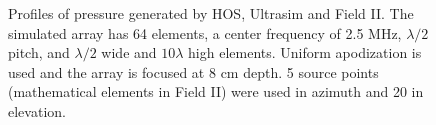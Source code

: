 \begin{figure}[!t]
\centerline{
\newline
{}
}
\caption{Profiles of pressure generated by HOS, Ultrasim and Field II. The simulated array has 64 elements, a center frequency of 2.5 MHz, $\lambda/2$ pitch, and $\lambda/2$ wide and $10\lambda$ high elements. Uniform apodization is used and the array is focused at 8 cm depth. 5 source points (mathematical elements in Field II) were used in azimuth and 20 in elevation.}
\label{fig:huygens_vs_ultrasim_fieldII}
\end{figure}

